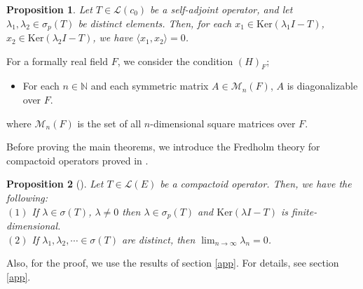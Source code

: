 \documentclass[12pt]{amsart}
\theoremstyle{plain}
\newtheorem{prop} {Proposition} [section]
\theoremstyle{definition}
\begin{document}
\begin{prop} \label{a5}
  Let $T \in \mathcal{L}(c_0)$ be a self-adjoint operator, and let $\lambda_1, \lambda_2 \in \sigma_p(T)$ be distinct elements. Then, for each $x_1 \in \mathrm{Ker}(\lambda_1 I - T)$, $x_2 \in \mathrm{Ker}(\lambda_2 I - T)$, we have $\langle x_1, x_2 \rangle = 0$.
\end{prop}

For a formally real field $F$, we consider the condition $(H)_F$;

\begin{itemize}
  \item[$(H)_F$] For each $n \in \mathbb{N}$ and each symmetric matrix $A \in \mathcal{M}_n(F)$, $A$ is diagonalizable over $F$.
\end{itemize}
where $\mathcal{M}_n(F)$ is the set of all $n$-dimensional square matrices over $F$.

Before proving the main theorems, we introduce the Fredholm theory for compactoid operators proved in \cite{comp}.

\begin{prop}[{\cite[Corollary 3.3, Theorem 5.6]{comp}}] \label{a1}
  Let $T \in \mathcal{L}(E)$ be a compactoid operator. Then, we have the following: \\
  $(1)$ If $\lambda \in \sigma(T)$, $\lambda \neq 0$ then $\lambda \in \sigma_p(T)$ and $\mathrm{Ker}(\lambda I - T)$ is finite-dimensional.\\
  $(2)$ If $\lambda_1, \lambda_2, \cdots \in \sigma(T)$ are distinct, then $\lim_{n \to \infty} \lambda_n = 0$. \\
\end{prop}

Also, for the proof, we use the results of section \ref{app}. For details, see section \ref{app}.
\end{document}
